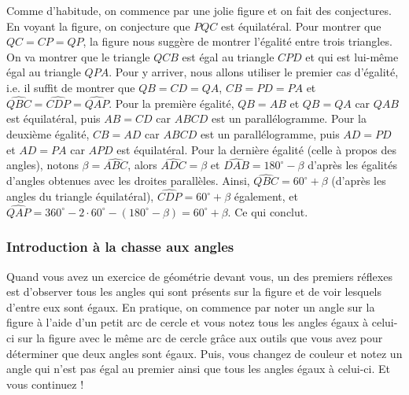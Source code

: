 \begin{sol}
Comme d'habitude, on commence par une jolie figure et on fait des conjectures.
\newline
En voyant la figure, on conjecture que $PQC$ est équilatéral. Pour montrer que $QC=CP=QP$, la figure nous suggère de montrer l'égalité entre trois triangles. On va montrer que le triangle $QCB$ est égal au triangle $CPD$ et qui est lui-même égal au triangle $QPA$. Pour y arriver, nous allons utiliser le premier cas d'égalité, i.e. il suffit de montrer que $QB=CD=QA$, $CB=PD=PA$ et $\widehat{QBC}=\widehat{CDP}=\widehat{QAP}$. Pour la première égalité, $QB=AB$ et $QB=QA$ car $QAB$ est équilatéral, puis $AB=CD$ car $ABCD$ est un parallélogramme. Pour la deuxième égalité, $CB=AD$ car $ABCD$ est un parallélogramme, puis $AD=PD$ et $AD=PA$ car $APD$ est équilatéral. Pour la dernière égalité (celle à propos des angles), notons $\beta=\widehat{ABC}$, alors $\widehat{ADC}=\beta$ et $\widehat{DAB}=180^\circ-\beta$ d'après les égalités d'angles obtenues avec les droites parallèles. Ainsi, $\widehat{QBC}=60^\circ+\beta$ (d'après les angles du triangle équilatéral), $\widehat{CDP}=60^\circ+\beta$ également, et $\widehat{QAP}=360^\circ-2\cdot 60^\circ-(180^\circ-\beta)=60^\circ+\beta$. Ce qui conclut.
\end{sol}

\subsubsection{Introduction à la chasse aux angles}
Quand vous avez un exercice de géométrie devant vous, un des premiers réflexes est d'observer tous les angles qui sont présents sur la figure et de voir lesquels d'entre eux sont égaux. En pratique, on commence par noter un angle sur la figure à l'aide d'un petit arc de cercle et vous notez tous les angles égaux à celui-ci sur la figure avec le même arc de cercle grâce aux outils que vous avez pour déterminer que deux angles sont égaux. Puis, vous changez de couleur et notez un angle qui n'est pas égal au premier ainsi que tous les angles égaux à celui-ci. Et vous continuez !

